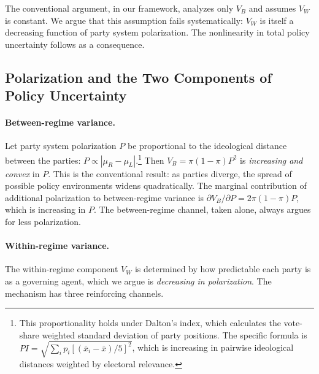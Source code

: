 \documentclass[12pt]{article}
\begin{document}
The conventional argument, in our framework, analyzes only $V_B$ and assumes
$V_W$ is constant. We argue that this assumption fails systematically:
$V_W$ is itself a decreasing function of party system polarization. The
nonlinearity in total policy uncertainty follows as a consequence.

\subsection{Polarization and the Two Components of Policy Uncertainty}

\paragraph{Between-regime variance.} Let party system polarization $P$
be proportional to the ideological distance between the parties:
$P \propto |\mu_R - \mu_L|$.\footnote{This proportionality holds under
Dalton's \citeyearpar{Dalton2008} index, which calculates the
vote-share weighted standard deviation of party positions. The specific
formula is $PI = \sqrt{\sum_i p_i [(\bar{x}_i - \bar{x})/5]^2}$, which
is increasing in pairwise ideological distances weighted by electoral
relevance.} Then $V_B = \pi(1-\pi)P^2$ is \textit{increasing and convex}
in $P$. This is the conventional result: as parties diverge, the
spread of possible policy environments widens quadratically. The marginal
contribution of additional polarization to between-regime variance is
$\partial V_B / \partial P = 2\pi(1-\pi)P$, which is increasing in $P$.
The between-regime channel, taken alone, always argues for less polarization.

\paragraph{Within-regime variance.} The within-regime component $V_W$
is determined by how predictable each party is as a governing agent, which
we argue is \textit{decreasing in polarization}. The mechanism has three
reinforcing channels.
\end{document}
